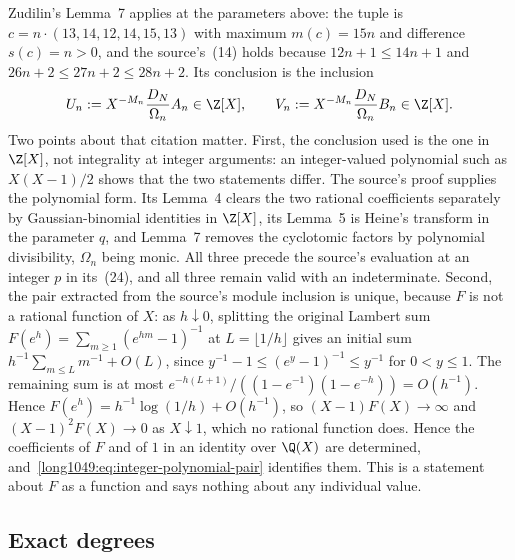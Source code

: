 Zudilin's Lemma~7 \cite[p.~161, (23)]{zudilin2004} applies at the parameters above: the tuple is
$c=n\cdot(13,14,12,14,15,13)$ with maximum $m(c)=15n$ and difference $s(c)=n>0$,
and the source's~(14) holds because $12n+1\le14n+1$ and
$26n+2\le27n+2\le28n+2$.  Its conclusion is the inclusion
\begin{equation}\label{long1049:eq:integer-polynomial-pair}
 U_n:=X^{-M_n}\frac{D_N}{\Omega_n}A_n\in\Z[X],\qquad
 V_n:=X^{-M_n}\frac{D_N}{\Omega_n}B_n\in\Z[X].
\end{equation}
Two points about that citation matter.  First, the conclusion used is the one
in $\Z[X]$, not integrality at integer arguments: an integer-valued polynomial
such as $X(X-1)/2$ shows that the two statements differ.  The source's proof
supplies the polynomial form.  Its Lemma~4 clears the two rational coefficients
separately by Gaussian-binomial identities in $\Z[X]$, its Lemma~5 is Heine's
transform in the parameter $q$, and Lemma~7 removes the cyclotomic factors by
polynomial divisibility, $\Omega_n$ being monic.  All three precede the source's
evaluation at an integer $p$ in its~(24), and all three remain valid with an
indeterminate.  Second, the pair extracted from the source's module inclusion is
unique, because $F$ is not a rational function of $X$: as $h\downarrow0$,
splitting the original Lambert sum $F(e^h)=\sum_{m\ge1}(e^{hm}-1)^{-1}$
at $L=\lfloor1/h\rfloor$ gives an initial sum
$h^{-1}\sum_{m\le L}m^{-1}+O(L)$, since
$y^{-1}-1\le(e^y-1)^{-1}\le y^{-1}$ for $0<y\le1$.
The remaining sum is at most
$e^{-h(L+1)}/((1-e^{-1})(1-e^{-h}))=O(h^{-1})$.  Hence
$F(e^h)=h^{-1}\log(1/h)+O(h^{-1})$, so
$(X-1)F(X)\to\infty$ and $(X-1)^{2}F(X)\to0$ as $X\downarrow1$, which no
rational function does.  Hence the coefficients of $F$ and of $1$ in an identity
over $\Q(X)$ are determined, and~\eqref{long1049:eq:integer-polynomial-pair} identifies
them.  This is a statement about $F$ as a function and says nothing about any
individual value.

\subsection{Exact degrees}\label{long1049:sec:degrees}

